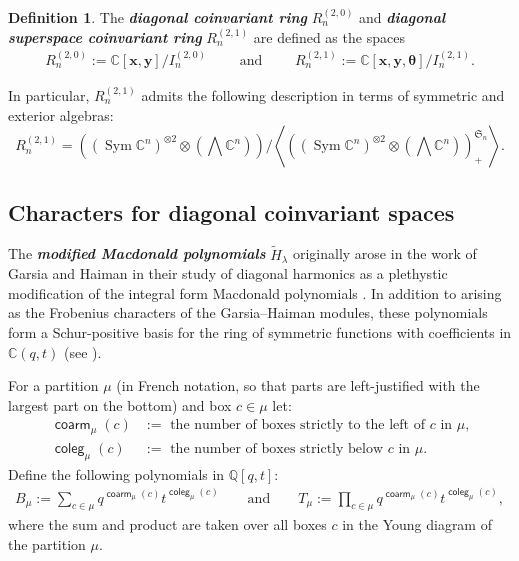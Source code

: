 \documentclass[11pt, noadjust, reqno]{amsart}
\theoremstyle{definition}
\newtheorem{definition}[theorem]{Definition}
\theoremstyle{remark}
\numberwithin{equation}{section}
\newcommand{\0}{\emptyset}
\newcommand{\Q}{\mathbb{Q}}
\newcommand{\C}{\mathbb{C}}
\DeclareMathOperator{\Sym}{Sym}
\DeclareMathOperator{\coarm}{\mathsf{coarm}}
\DeclareMathOperator{\coleg}{\mathsf{coleg}}
\newcommand{\newword}[1]{\emph{\textbf{#1}}}
\begin{document}
\begin{definition} 
The \newword{diagonal coinvariant ring} $R_n^{(2,0)}$ and \newword{diagonal superspace coinvariant ring} $R_n^{(2,1)}$ are defined as the spaces
    \begin{align*} 
R_n^{(2,0)} := \C[\bm{x}, \bm{y}]/I_n^{(2,0)} \qquad \text{ and } \qquad
R_n^{(2,1)} := \C[\bm{x}, \bm{y},\bm{\theta}]/I_n^{(2,1)}.
\end{align*}
\end{definition}
In particular, $R_n^{(2,1)}$ admits the following description in terms of symmetric and exterior algebras:
\begin{equation*}
    R_n^{(2,1)} = \left(\left(\Sym\C^n\right)^{\otimes 2} \otimes \left(\bigwedge\C^n\right)\right)\Big/\left\langle \left(\left(\Sym\C^n\right)^{\otimes 2} \otimes \left(\bigwedge\C^n\right)\right)^{\mathfrak{S}_n}_+ \right\rangle.
\end{equation*}


\subsection{Characters for diagonal coinvariant spaces} 

The \newword{modified Macdonald polynomials} $\tilde{H}_\lambda$ originally arose in the work of Garsia and Haiman in their study of diagonal harmonics as a plethystic modification of the integral form Macdonald polynomials \cite{Macdonald, GarsiaHaiman1993, GarsiaHaiman1996}. 
In addition to arising as the Frobenius characters of the Garsia--Haiman modules, these polynomials form a Schur-positive basis for the ring of symmetric functions with coefficients in $\C(q,t)$ (see \cite{HaimanCDM}). 

For a partition $\mu$ (in French notation, so that parts are left-justified with the largest part on the bottom) and box $c \in \mu$ let:
\begin{align*}
\coarm_\mu(c)&:= \text{ the number of boxes strictly to the left of $c$ in $\mu$,}
\\
\coleg_\mu(c)&:= \text{ the number of boxes strictly below $c$ in $\mu$}.
\end{align*}
Define the following polynomials in $\Q[q,t]$: 
\begin{align*}
    B_\mu := \sum_{c \in \mu} q^{\coarm_\mu(c)} t^{\coleg_\mu(c)} \qquad \text{and} \qquad
    T_\mu := \prod_{c \in \mu} q^{\coarm_\mu(c)} t^{\coleg_\mu(c)},
\end{align*}
where the sum and product are taken over all boxes $c$ in the Young diagram of the partition $\mu$.
\end{document}
